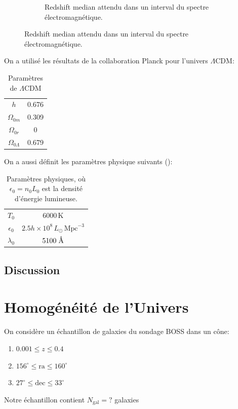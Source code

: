 \documentclass{article}
\newcommand{\angstrom}{\textup{\AA}}
\numberwithin{equation}{section}
\newcommand{\s}{\hspace{0.1cm}}
\begin{document}
\begin{figure}[H]
\begin{subfigure}[t]{0.45\textwidth}
                \caption{Redshift median attendu dans un interval du spectre 
                électromagnétique.}
                \label{fig:z_median}
        \end{subfigure}
\end{figure}

On a utilisé les résultats de la collaboration Planck pour l'univers $\Lambda$CDM:
\begin{table}[H]
        \centering
        \begin{tabular}{cc}
                \toprule
                $h$ & 0.676 \\
                $\Omega_{0m}$ & 0.309\\
                $\Omega_{0r}$ & 0 \\
                $\Omega_{0\Lambda}$ & 0.679\\
                \bottomrule
                
        \end{tabular}
        \caption{Paramètres de $\Lambda$CDM}
        \label{tab:LCDMparam}
\end{table}
On a aussi définit les paramètres physique suivants (\cite{Wesson1991}):
\begin{table}[H]
        \centering
        \begin{tabular}{cc}
                \toprule 
                $T_0$ & $6000\, \text{K}$ \\
                $\epsilon_0 $ & $2.5 h\times 10^{8}\, L_{\odot}\, \text{Mpc}^{-3}$ \\
                $\lambda_0$ & $5100\s \angstrom$ \\
                \bottomrule 
        \end{tabular}
        \caption{Paramètres physiques, où $\epsilon_0 = n_0L_0$ est la densité 
        d'énergie lumineuse.}
        \label{tab:PhysParam}
\end{table}

\subsection{Discussion}





\section{Homogénéité de l'Univers}
On considère un échantillon de galaxies du sondage BOSS  dans un cône:
\begin{enumerate}
        \item $0.001 \leq z \leq 0.4$
        \item $156^{\circ} \leq \text{ra} \leq 160^{\circ}$
        \item $27^{\circ} \leq \text{dec} \leq 33^{\circ}$
\end{enumerate}
Notre échantillon contient $N_\text{gal} = ?$ galaxies
\end{document}
